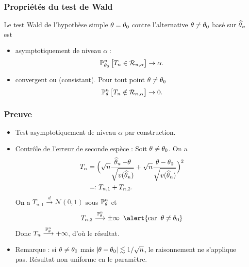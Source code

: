 \begin{frame}
\frametitle{Propriétés du test de Wald}
\begin{prop}
Le test Wald de l'hypothèse simple $\theta=\theta_0$ contre l'alternative $\theta \neq \theta_0$ basé sur $\operatorname{\widehat \theta_{\mathnormal{n}}}$ est
\begin{itemize}
\item \alert{asymptotiquement} de niveau $\alpha$ :
$$\operatorname{{\mathbb P}}_{\theta_0}^n\big[T_n \in {\mathcal R}_{n,\alpha}\big]\rightarrow \alpha.$$
\item \alert{convergent ou (consistant)}. Pour tout point $\theta \neq \theta_0$
$$\operatorname{{\mathbb P}}_\theta^n\big[T_n \notin {\mathcal R}_{n,\alpha}\big] \rightarrow 0.$$
\end{itemize}
\end{prop}
\end{frame}

\begin{frame}
\frametitle{Preuve}
\begin{itemize}
\item Test asymptotiquement de niveau $\alpha$ \alert{par construction}.
\item \underline{Contrôle de l'erreur de seconde espèce :}
Soit $\theta \neq \theta_0$. On a
\begin{align*}
T_n & = \Big(\sqrt{n}\frac{\operatorname{\widehat \theta_{\mathnormal{n}}}-\theta}{\sqrt{v(\operatorname{\widehat \theta_{\mathnormal{n}}})}}+\sqrt{n}\frac{\theta-\theta_0}{\sqrt{v(\operatorname{\widehat \theta_{\mathnormal{n}}})}}\Big)^2 \\
& =: T_{n,1}+T_{n,2}.
\end{align*}
On a $T_{n,1} \stackrel{d}{\longrightarrow} {\mathcal N}(0,1)$ sous $\operatorname{{\mathbb P}}_{\theta}^n$ et
$$T_{n,2} \stackrel{\PP_{\truetheta}^n}{\longrightarrow} \pm \infty\;\;\alert{\text{car}\;\;\truetheta \neq \truetheta_0}$$
Donc $T_{n}\stackrel{\operatorname{{\mathbb P}}_{\theta}^n}{\longrightarrow}+\infty$, d'où le résultat.
\item \alert{Remarque} : si $\theta \neq \theta_0$ mais $|\theta - \theta_0| \lesssim 1/\sqrt{n}$, le raisonnement ne s'applique pas. Résultat \alert{non uniforme en le paramètre}.
\end{itemize}
\end{frame}

